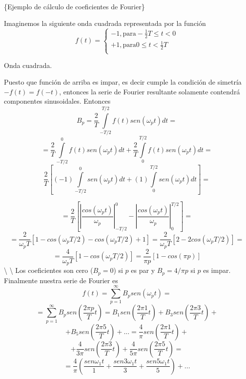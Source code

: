 \documentclass[
]{agujournal2019}
\begin{document}
\vspace{0.75cm}

\{\textbf \noindent Ejemplo de cálculo de coeficientes de Fourier\}

Imaginemos la siguiente onda cuadrada representada por la función
\[f(t)=
 \left\lbrace
  \begin{array}{l}
     -1,\text{para} -\frac{1}{2}T\le t< 0 \\
     +1,\text{para} 0\le t< \frac{1}{2}T  \\
  \end{array}
  \right.\]

\begin{center}
\end{center}
\begin{center}
Onda cuadrada.
\end{center}

Puesto que función de arriba es impar, es decir cumple la condición de
simetría \(-f(t)=f(-t)\), entonces la serie de Fourier resultante
solamente contendrá componentes sinusoidales. Entonces
\[B_p=\frac{2}{T}\int\limits_{-T/2}^{T/2} f(t) sen(\omega_p t) dt=\]
\[=\frac{2}{T}\int\limits_{-T/2}^{0} f(t) sen(\omega_p t) dt + \frac{2}{T}\int\limits_{0}^{T/2} f(t) sen(\omega_p t) dt=\]
\[\frac{2}{T}\left[ (-1) \int\limits_{-T/2}^{0} sen(\omega_p t) dt +
                   (1) \int\limits_{0}^{T/2} sen(\omega_p t) dt \right]=\]

\[=\frac{2}{T}\left[ \left|\frac{cos(\omega_p t)}{\omega_p}\right|_{-T/2}^{0}
                     -\left|\frac{cos(\omega_p t)}{\omega_p}\right|_{0}^{T/2} \right]=\]
\[=\frac{2}{\omega_p T}\left[ 1 - cos(\omega_p T/2) - cos(\omega_p T/2) + 1  \right]=
\frac{2}{\omega_p T}\left[2 -2cos(\omega_p T/2)\right]=\]
\[=\frac{4}{\omega_p T}\left[1-cos(\omega_p T/2)\right]=
\frac{2}{\pi p}\left[1-cos(\pi p)\right]\] \textbackslash{}
\textbackslash{} Los coeficientes son cero (\(B_p=0\)) si \(p\) es par y
\(B_p=4/\pi p\) si \(p\) es impar. Finalmente nuestra serie de Fourier
es \[f(t)=\sum\limits^\infty_{p=1}B_p sen(\omega_p t)=\]
\[=\sum\limits^\infty_{p=1}B_p sen\left(\frac{2\pi p}{T} t\right)=
B_1 sen\left(\frac{2\pi 1}{T} t\right) + B_3 sen\left(\frac{2\pi 3}{T} t\right) +\]
\[+B_5 sen\left(\frac{2\pi 5}{T} t\right) + ... =\frac{4}{\pi}sen\left(\frac{2\pi 1}{T} t\right) +\]
\[+\frac{4}{3\pi}sen\left(\frac{2\pi 3}{T} t\right) +\frac{4}{5\pi}sen\left(\frac{2\pi 5}{T} t\right)=\]
\[=\frac{4}{\pi}\left( \frac{sen{\omega_1 t}}{1} + \frac{sen{3\omega_1 t}}{3} + \frac{sen{5\omega_1 t}}{5}\right)+...\]
\end{document}
